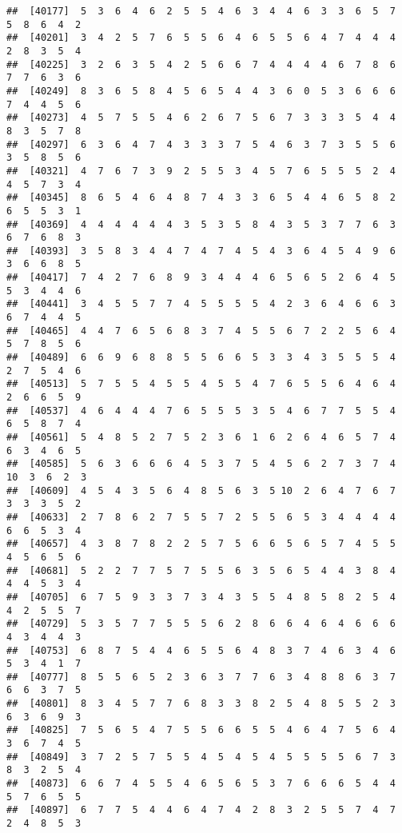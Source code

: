 \documentclass[
]{book}
\begin{document}
\begin{verbatim}
##  [40177]  5  3  6  4  6  2  5  5  4  6  3  4  4  6  3  3  6  5  7  5  8  6  4  2
##  [40201]  3  4  2  5  7  6  5  5  6  4  6  5  5  6  4  7  4  4  4  2  8  3  5  4
##  [40225]  3  2  6  3  5  4  2  5  6  6  7  4  4  4  4  6  7  8  6  7  7  6  3  6
##  [40249]  8  3  6  5  8  4  5  6  5  4  4  3  6  0  5  3  6  6  6  7  4  4  5  6
##  [40273]  4  5  7  5  5  4  6  2  6  7  5  6  7  3  3  3  5  4  4  8  3  5  7  8
##  [40297]  6  3  6  4  7  4  3  3  3  7  5  4  6  3  7  3  5  5  6  3  5  8  5  6
##  [40321]  4  7  6  7  3  9  2  5  5  3  4  5  7  6  5  5  5  2  4  4  5  7  3  4
##  [40345]  8  6  5  4  6  4  8  7  4  3  3  6  5  4  4  6  5  8  2  6  5  5  3  1
##  [40369]  4  4  4  4  4  4  3  5  3  5  8  4  3  5  3  7  7  6  3  6  7  6  8  3
##  [40393]  3  5  8  3  4  4  7  4  7  4  5  4  3  6  4  5  4  9  6  3  6  6  8  5
##  [40417]  7  4  2  7  6  8  9  3  4  4  4  6  5  6  5  2  6  4  5  5  3  4  4  6
##  [40441]  3  4  5  5  7  7  4  5  5  5  5  4  2  3  6  4  6  6  3  6  7  4  4  5
##  [40465]  4  4  7  6  5  6  8  3  7  4  5  5  6  7  2  2  5  6  4  5  7  8  5  6
##  [40489]  6  6  9  6  8  8  5  5  6  6  5  3  3  4  3  5  5  5  4  2  7  5  4  6
##  [40513]  5  7  5  5  4  5  5  4  5  5  4  7  6  5  5  6  4  6  4  2  6  6  5  9
##  [40537]  4  6  4  4  4  7  6  5  5  5  3  5  4  6  7  7  5  5  4  6  5  8  7  4
##  [40561]  5  4  8  5  2  7  5  2  3  6  1  6  2  6  4  6  5  7  4  6  3  4  6  5
##  [40585]  5  6  3  6  6  6  4  5  3  7  5  4  5  6  2  7  3  7  4 10  3  6  2  3
##  [40609]  4  5  4  3  5  6  4  8  5  6  3  5 10  2  6  4  7  6  7  3  3  3  5  2
##  [40633]  2  7  8  6  2  7  5  5  7  2  5  5  6  5  3  4  4  4  4  6  6  5  3  4
##  [40657]  4  3  8  7  8  2  2  5  7  5  6  6  5  6  5  7  4  5  5  4  5  6  5  6
##  [40681]  5  2  2  7  7  5  7  5  5  6  3  5  6  5  4  4  3  8  4  4  4  5  3  4
##  [40705]  6  7  5  9  3  3  7  3  4  3  5  5  4  8  5  8  2  5  4  4  2  5  5  7
##  [40729]  5  3  5  7  7  5  5  5  6  2  8  6  6  4  6  4  6  6  6  4  3  4  4  3
##  [40753]  6  8  7  5  4  4  6  5  5  6  4  8  3  7  4  6  3  4  6  5  3  4  1  7
##  [40777]  8  5  5  6  5  2  3  6  3  7  7  6  3  4  8  8  6  3  7  6  6  3  7  5
##  [40801]  8  3  4  5  7  7  6  8  3  3  8  2  5  4  8  5  5  2  3  6  3  6  9  3
##  [40825]  7  5  6  5  4  7  5  5  6  6  5  5  4  6  4  7  5  6  4  3  6  7  4  5
##  [40849]  3  7  2  5  7  5  5  4  5  4  5  4  5  5  5  5  6  7  3  8  3  2  5  4
##  [40873]  6  6  7  4  5  5  4  6  5  6  5  3  7  6  6  6  5  4  4  5  7  6  5  5
##  [40897]  6  7  7  5  4  4  6  4  7  4  2  8  3  2  5  5  7  4  7  2  4  8  5  3

\end{verbatim}
\end{document}

